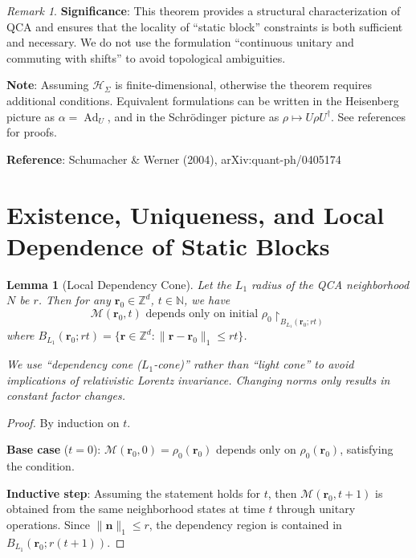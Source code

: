 \documentclass[11pt]{article}
\newtheorem{lemma}[theorem]{Lemma}
\theoremstyle{definition}
\theoremstyle{remark}
\newtheorem{remark}[theorem]{Remark}
\DeclareMathOperator{\Ad}{Ad}
\begin{document}
\begin{remark}
\textbf{Significance}: This theorem provides a structural characterization of QCA and ensures that the locality of ``static block'' constraints is both sufficient and necessary. We do not use the formulation ``continuous unitary and commuting with shifts'' to avoid topological ambiguities.

\textbf{Note}: Assuming \( \mathcal{H}_\Sigma \) is finite-dimensional, otherwise the theorem requires additional conditions. Equivalent formulations can be written in the Heisenberg picture as \( \alpha = \Ad_U \), and in the Schrödinger picture as \( \rho \mapsto U \rho U^\dagger \). See references for proofs.

\textbf{Reference}: Schumacher \& Werner (2004), arXiv:quant-ph/0405174
\end{remark}

\section{Existence, Uniqueness, and Local Dependence of Static Blocks}\label{sec:existence}

\begin{lemma}[Local Dependency Cone]\label{lem:qdependency}
Let the \( L_1 \) radius of the QCA neighborhood \( N \) be \( r \). Then for any \( \mathbf{r}_0 \in \mathbb{Z}^d \), \( t \in \mathbb{N} \), we have
\[
\mathcal{M}(\mathbf{r}_0, t) \text{ depends only on initial } \rho_0 \restriction_{B_{L_1}(\mathbf{r}_0; rt)}
\]
where \( B_{L_1}(\mathbf{r}_0; rt) = \{ \mathbf{r} \in \mathbb{Z}^d : \|\mathbf{r} - \mathbf{r}_0\|_1 \le rt \} \).

We use ``dependency cone (\( L_1 \)-cone)'' rather than ``light cone'' to avoid implications of relativistic Lorentz invariance. Changing norms only results in constant factor changes.
\end{lemma}

\begin{proof}
By induction on \( t \).

\textbf{Base case} (\( t=0 \)): \( \mathcal{M}(\mathbf{r}_0, 0) = \rho_0(\mathbf{r}_0) \) depends only on \( \rho_0(\mathbf{r}_0) \), satisfying the condition.

\textbf{Inductive step}: Assuming the statement holds for \( t \), then \( \mathcal{M}(\mathbf{r}_0, t+1) \) is obtained from the same neighborhood states at time \( t \) through unitary operations. Since \( \|\mathbf{n}\|_1 \le r \), the dependency region is contained in \( B_{L_1}(\mathbf{r}_0; r(t+1)) \).
\end{proof}
\end{document}

